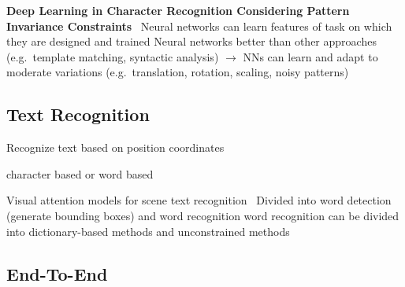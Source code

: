 \textbf{Deep Learning in Character Recognition Considering Pattern Invariance
Constraints}~\cite{oyedotun_deep_2015}
Neural networks can learn features of task on which they are designed and trained
Neural networks better than other approaches (e.g.\ template matching, syntactic analysis)
$\rightarrow$ NNs can learn and adapt to moderate variations (e.g.\ translation, rotation, scaling,
noisy patterns)

\subsection*{Text Recognition}
Recognize text based on position coordinates

character based or word based

Visual attention models for scene text recognition~\cite{ghosh_visual_2017}
Divided into word detection (generate bounding boxes) and word recognition
word recognition can be divided into dictionary-based methods and unconstrained methods

\subsection*{End-To-End}
